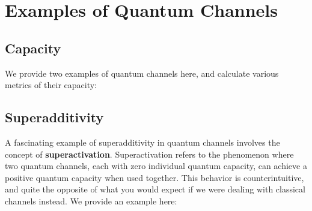 \section{Examples of Quantum Channels}

\subsection{Capacity}

We provide two examples of quantum channels here, and calculate various metrics of
their capacity:



\subsection{Superadditivity}

A fascinating example of superadditivity in quantum channels involves the concept
of \textbf{superactivation}. Superactivation refers to the phenomenon where two
quantum channels, each with zero individual quantum capacity, can achieve a positive
quantum capacity when used together. This behavior is counterintuitive, and quite
the opposite of what you would expect if we were dealing with classical channels
instead. We provide an example here:

